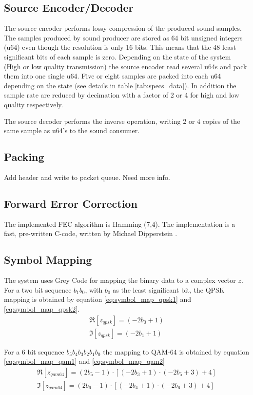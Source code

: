 \subsection{Source Encoder/Decoder}
The source encoder performs lossy compression of the produced sound samples. The samples produced by sound producer are stored as 64 bit unsigned integers (u64) even though the resolution is only 16 bits. This means that the 48 least significant bits of each sample is zero. Depending on the state of the system (High or low quality transmission) the source encoder read several u64s and pack them into one single u64. Five or eight samples are packed into each u64 depending on the state (see details in table \ref{tab:specs_data}). In addition the sample rate are reduced by decimation with a factor of 2 or 4 for high and low quality respectively. 

The source decoder performs the inverse operation, writing 2 or 4 copies of the same sample as u64's to the sound consumer.  

\subsection{Packing}
Add header and write to packet queue. Need more info.

\subsection{Forward Error Correction}
The implemented FEC algorithm is Hamming (7,4). The implementation is a fast, pre-written C-code, written by Michael Dipperstein \cite{hamming}. 

\subsection{Symbol Mapping}
The system uses Grey Code for mapping the binary data to a complex vector $z$. For a two bit sequence $b_1b_0$, with $b_0$ as the least significant bit, the QPSK mapping is obtained by equation \ref{eq:symbol_map_qpsk1} and \ref{eq:symbol_map_qpsk2}. 
\begin{align}
\Re[z_{qpsk}] = (-2b_0+1) \label{eq:symbol_map_qpsk1} \\ 
\Im[z_{qpsk}] = (-2b_1+1) \label{eq:symbol_map_qpsk2}
\end{align}

For a 6 bit sequence $b_5b_4b_3b_2b_1b_0$ the mapping to QAM-64 is obtained by equation \ref{eq:symbol_map_qam1} and \ref{eq:symbol_map_qam2}
\begin{align}
\Re[z_{qam64}] = (2b_5-1) \cdot [(-2b_3+1) \cdot (-2b_5+3) +4] \label{eq:symbol_map_qam1} \\ 
\Im[z_{qam64}] = (2b_6-1) \cdot [(-2b_4+1) \cdot (-2b_6+3) +4]\label{eq:symbol_map_qam2}
\end{align}

